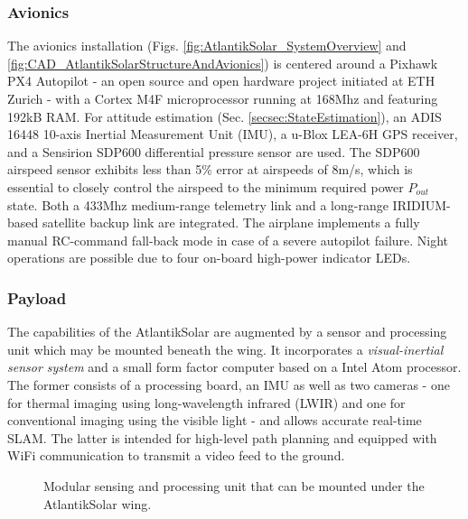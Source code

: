 \subsubsection{Avionics}
The avionics installation (Figs. \ref{fig:AtlantikSolar_SystemOverview} and \ref{fig:CAD_AtlantikSolarStructureAndAvionics}) is centered around a Pixhawk PX4 Autopilot - an open source and open hardware project initiated at ETH Zurich - with a Cortex M4F microprocessor running at 168Mhz and featuring 192kB RAM. For attitude estimation (Sec. \ref{secsec:StateEstimation}), an ADIS 16448 10-axis Inertial Measurement Unit (IMU), a u-Blox LEA-6H GPS receiver, and a Sensirion SDP600 differential pressure sensor are used. The SDP600 airspeed sensor exhibits less than 5\% error at airspeeds of 8m/s, which is essential to closely control the airspeed to the minimum required power $P_{out}$ state. Both a 433Mhz medium-range telemetry link and a long-range IRIDIUM-based satellite backup link are integrated. The airplane implements a fully manual RC-command fall-back mode in case of a severe autopilot failure. Night operations are possible due to four on-board high-power indicator LEDs.


\subsubsection{Payload}
The capabilities of the AtlantikSolar are augmented by a sensor and processing unit which may be mounted beneath the wing. It incorporates a \emph{visual-inertial sensor system} \cite{nikolic2014synchronized} and a small form factor computer based on a Intel Atom processor. The former consists of a processing board, an IMU as well as two cameras - one for thermal imaging using long-wavelength infrared (LWIR) and one for conventional imaging using the visible light - and allows accurate real-time SLAM. The latter is intended for high-level path planning and equipped with WiFi communication to transmit a video feed to the ground.
\begin{figure}[!htb]
  \begin{center}
  \def\svgwidth{\columnwidth}
  
  \end{center}
  \caption[Modular sensing and processing unit.]{Modular sensing and processing unit that can be mounted under the AtlantikSolar wing.}
  \label{f:03_sensor_pod}
\end{figure}
  

